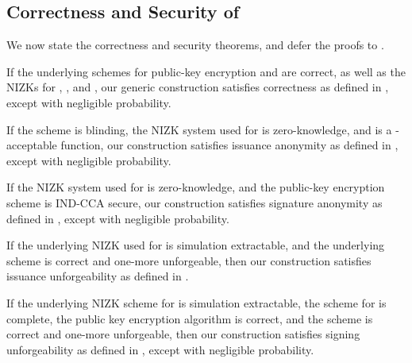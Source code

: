\subsection{Correctness and Security of \CUASGen}
\label{ssec:security-uas}

We now state the correctness and security theorems, and defer the proofs to
.

\begin{theorem}
  \label{thm:correctness-uas}
  If the underlying schemes for public-key encryption and \SBCM are correct, as
  well as the NIZKs for \RelIss, \RelSig,
  and \RelIns, our generic construction \CUASGen satisfies
  correctness as defined in , except with negligible
  probability.
\end{theorem}

\begin{theorem}
  \label{thm:issue-anonymity-uas}
  If the \SBCM scheme is blinding, the NIZK system used for \RelIss 
  is zero-knowledge, and \fissue is a \UAS-acceptable function, our \CUASGen
  construction satisfies issuance anonymity as defined in
  , except with negligible probability.
\end{theorem}

\begin{theorem}
  \label{thm:sign-anonymity-uas}
  If the NIZK system used for \RelSig is zero-knowledge, and the
  public-key encryption scheme is IND-CCA secure, our \CUASGen construction
  satisfies signature anonymity as defined in ,
  except with negligible probability.
\end{theorem}

\begin{theorem}
  \label{thm:issue-forge-uas}  
  If the underlying NIZK used for \RelIss is simulation extractable, and the
  underlying \SBCM scheme is correct and one-more unforgeable, then our \CUASGen
  construction satisfies issuance unforgeability as defined in
  .
\end{theorem}

\begin{theorem}
  \label{thm:sign-forge-uas}
  If the underlying NIZK scheme for \RelSig is simulation extractable, the
  scheme for \RelIns is complete, the public key encryption algorithm is
  correct, and the \SBCM scheme is correct and one-more unforgeable, then our
  \CUASGen construction satisfies signing unforgeability as defined in
  , except with negligible probability.
\end{theorem}

